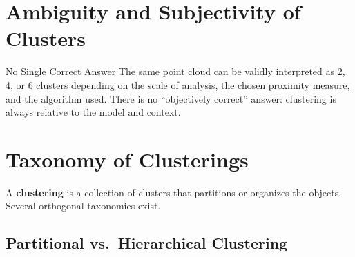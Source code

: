 \section{Ambiguity and Subjectivity of Clusters}
\label{sec:cluster-ambiguity}

\begin{alertblock}{No Single Correct Answer}
The same point cloud can be validly interpreted as 2, 4, or 6 clusters depending on the scale of analysis, the chosen proximity measure, and the algorithm used. There is no ``objectively correct'' answer: clustering is always relative to the model and context.
\end{alertblock}

\section{Taxonomy of Clusterings}
\label{sec:clustering-types}

A \textbf{clustering} is a collection of clusters that partitions or organizes the objects. Several orthogonal taxonomies exist.

\subsection{Partitional vs.\ Hierarchical Clustering}

